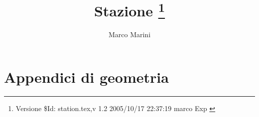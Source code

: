 \documentclass{article}
\begin{document}
  \title{Stazione \thanks{Versione \$Id: station.tex,v 1.2 2005/10/17 22:37:19 marco Exp $ $}}
  \author{Marco Marini}
  \maketitle
  \part{Appendici di geometria}
  
  
  
\end{document}
